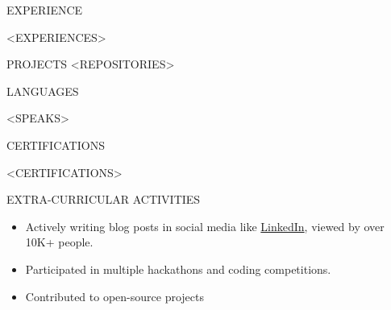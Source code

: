 \documentclass{resume}
\begin{document}
\begin{rSection}{EXPERIENCE}

<EXPERIENCES>
\end{rSection}

\vspace{1.5em}


\begin{rSection}{PROJECTS}    
    <REPOSITORIES>
\end{rSection}
\vspace{1.5em}


\begin{rSection}{LANGUAGES}

\begin{itemize}
    <SPEAKS>
\end{itemize}

\end{rSection}




\begin{rSection}{CERTIFICATIONS}

    \begin{itemize}
        <CERTIFICATIONS>
    \end{itemize}
    
    \end{rSection}
    


\begin{rSection}{EXTRA-CURRICULAR ACTIVITIES}

    \begin{itemize}
        \item Actively writing blog posts in social media like \href{https://www.linkedin.com/in/rahul-marban}{LinkedIn}, viewed by over 10K+ people.
        \item Participated in multiple hackathons and coding competitions.
        \item Contributed to open-source projects
    \end{itemize}
    
    \end{rSection}
    
    \vspace{1.5em}

    
    
\end{document}
